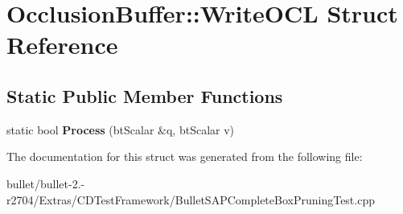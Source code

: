\hypertarget{struct_occlusion_buffer_1_1_write_o_c_l}{\section{Occlusion\+Buffer\+:\+:Write\+O\+C\+L Struct Reference}
\label{struct_occlusion_buffer_1_1_write_o_c_l}
}
\subsection*{Static Public Member Functions}
\begin{DoxyCompactItemize}
\item 
\hypertarget{struct_occlusion_buffer_1_1_write_o_c_l_a4cea0948c26247cedf0050f514e66f88}{static bool {\bfseries Process} (bt\+Scalar \&q, bt\+Scalar v)}\label{struct_occlusion_buffer_1_1_write_o_c_l_a4cea0948c26247cedf0050f514e66f88}

\end{DoxyCompactItemize}


The documentation for this struct was generated from the following file\+:\begin{DoxyCompactItemize}
\item 
bullet/bullet-\/2.-\/r2704/\+Extras/\+C\+D\+Test\+Framework/Bullet\+S\+A\+P\+Complete\+Box\+Pruning\+Test.\+cpp\end{DoxyCompactItemize}
